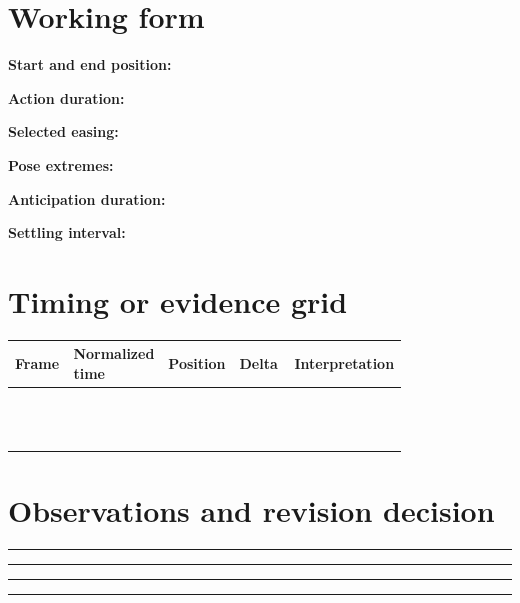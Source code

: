 \documentclass[10pt,letterpaper]{article}
\begin{document}
\section{Working form}
\noindent\textbf{Start and end position:}\quad\hrulefill\par\vspace{10pt}
\noindent\textbf{Action duration:}\quad\hrulefill\par\vspace{10pt}
\noindent\textbf{Selected easing:}\quad\hrulefill\par\vspace{10pt}
\noindent\textbf{Pose extremes:}\quad\hrulefill\par\vspace{10pt}
\noindent\textbf{Anticipation duration:}\quad\hrulefill\par\vspace{10pt}
\noindent\textbf{Settling interval:}\quad\hrulefill\par\vspace{10pt}\section{Timing or evidence grid}
\begin{longtable}{|p{0.156\linewidth}|p{0.156\linewidth}|p{0.156\linewidth}|p{0.156\linewidth}|p{0.156\linewidth}|}
\hline
\textbf{Frame} & \textbf{Normalized time} & \textbf{Position} & \textbf{Delta} & \textbf{Interpretation}\\\hline
\endhead
\rule{0pt}{20pt} &  &  &  & \\\hline
\rule{0pt}{20pt} &  &  &  & \\\hline
\rule{0pt}{20pt} &  &  &  & \\\hline
\rule{0pt}{20pt} &  &  &  & \\\hline
\rule{0pt}{20pt} &  &  &  & \\\hline
\rule{0pt}{20pt} &  &  &  & \\\hline
\rule{0pt}{20pt} &  &  &  & \\\hline
\rule{0pt}{20pt} &  &  &  & \\\hline
\rule{0pt}{20pt} &  &  &  & \\\hline
\rule{0pt}{20pt} &  &  &  & \\\hline
\rule{0pt}{20pt} &  &  &  & \\\hline
\rule{0pt}{20pt} &  &  &  & \\\hline
\end{longtable}
\section{Observations and revision decision}
\noindent\rule{\linewidth}{0.4pt}\par\vspace{18pt}\noindent\rule{\linewidth}{0.4pt}\par\vspace{18pt}\noindent\rule{\linewidth}{0.4pt}\par\vspace{18pt}\noindent\rule{\linewidth}{0.4pt}\par\vspace{18pt}
\end{document}
